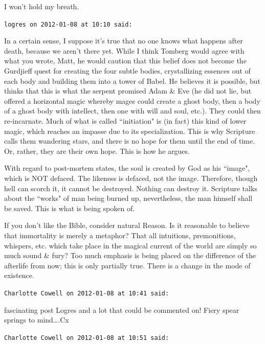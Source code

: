 \begin{footnotesize}
\begin{sffamily}
I won't hold my breath.


\hfill

\texttt{logres on 2012-01-08 at 10:10 said: }

In a certain sense, I suppose it's true that no one knows what happens after death, because we aren't there yet. While I think Tomberg would agree with what you wrote, Matt, he would caution that this belief does not become the Gurdjieff quest for creating the four subtle bodies, crystallizing essences out of each body and building them into a tower of Babel. He believes it is possible, but thinks that this is what the serpent promised Adam \& Eve (he did not lie, but offered a horizontal magic whereby mages could create a ghost body, then a body of a ghost body with intellect, then one with will and soul, etc.). They could then re-incarnate. Much of what is called ``initiation" is (in fact) this kind of lower magic, which reaches an impasse due to its specialization. This is why Scripture calls them wandering stars, and there is no hope for them until the end of time. Or, rather, they are their own hope. This is how he argues.

With regard to post-mortem states, the soul is created by God as his ``image", which is NOT defaced. The likeness is defaced, not the image. Therefore, though hell can scorch it, it cannot be destroyed. Nothing can destroy it. Scripture talks about the ``works" of man being burned up, nevertheless, the man himself shall be saved. This is what is being spoken of.

If you don't like the Bible, consider natural Reason. Is it reasonable to believe that immortality is merely a metaphor? That all intuitions, premonitions, whispers, etc. which take place in the magical current of the world are simply so much sound \& fury? Too much emphasis is being placed on the difference of the afterlife from now; this is only partially true. There is a change in the mode of existence.


\hfill

\texttt{Charlotte Cowell on 2012-01-08 at 10:41 said: }

fascinating post Logres and a lot that could be commented on! Fiery spear springs to mind….Cx


\hfill

\texttt{Charlotte Cowell on 2012-01-08 at 10:51 said: }


\end{sffamily}
\end{footnotesize}

